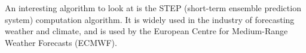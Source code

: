 \documentclass[../paper.tex]{subfiles}
\begin{document}
    An interesting algorithm to look at is the STEP (short-term ensemble prediction system) computation algorithm.
    It is widely used in the industry of forecasting weather and climate, and is used by the European Centre for Medium-Range Weather Forecasts (ECMWF)\cite{a1, b4}. \\
\end{document}
